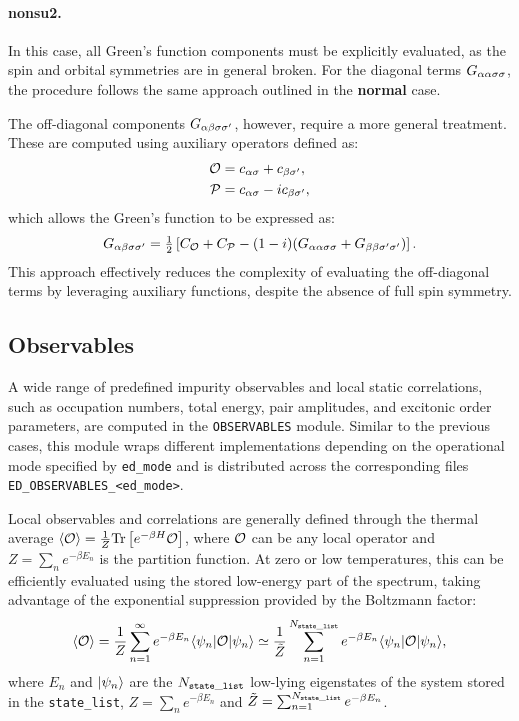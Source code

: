 \documentclass[edipack_sp.tex]{subfiles}
\begin{document}
\paragraph{{\bf nonsu2}.}
In this case, all Green's function components 
must be explicitly evaluated, as the spin and orbital 
symmetries are in general broken. For the diagonal terms 
$G_{\alpha\alpha\sigma\sigma}$, the procedure follows the same approach 
outlined in the {\bf normal} case. 

The off-diagonal components $G_{\alpha\beta\sigma\sigma'}$, however, 
require a more general treatment. These are computed using 
auxiliary operators defined as:
\begin{align*}
{\cal O} &= c_{\alpha\sigma} + c_{\beta\sigma'}, \\
{\cal P} &= c_{\alpha\sigma} - i c_{\beta\sigma'},
\end{align*}
which allows the Green's function to be expressed as:
\begin{equation}
G_{\alpha\beta\sigma\sigma'} = \tfrac{1}{2} \left[ C_{\cal O} + C_{\cal P} - 
(1-i)(G_{\alpha\alpha\sigma\sigma} + G_{\beta\beta\sigma'\sigma'}) \right].
\end{equation}
This approach effectively reduces the complexity of 
evaluating the off-diagonal terms by leveraging auxiliary 
functions, despite the absence of full spin symmetry.





\subsection{Observables}\label{sSecObc}
A wide range of predefined impurity observables and local 
static correlations, such as occupation numbers, total 
energy, pair amplitudes, and excitonic order parameters, 
are computed in the \texttt{OBSERVABLES} module. Similar to the
previous cases, this module wraps different implementations 
depending on the operational mode specified by 
{\tt ed\_mode} and is distributed across the corresponding 
files {\tt ED\_OBSERVABLES\_<ed\_mode>}. 



Local observables and correlations are generally defined 
through the thermal average 
$\langle {\cal O}\rangle = \tfrac{1}{Z}{\rm Tr}\left[e^{-\beta H}{\cal O}\right]$, 
where ${\cal O}$ can be any local operator and  $Z = \sum_n e^{-\beta E_n}$ is the partition function. 
At zero or low temperatures, this can be efficiently 
evaluated using the stored low-energy part of the spectrum, 
taking advantage of the exponential suppression provided by 
the Boltzmann factor:
\begin{equation}
\langle {\cal O}\rangle 
= \frac{1}{Z}\sum_{n=1}^{\infty} e^{-\beta E_n}
\langle \psi_n| {\cal O} |\psi_n\rangle\simeq \frac{1}{\tilde{Z}}\sum_{n=1}^{N_{\tt state\_list}} e^{-\beta E_n}
\langle \psi_n| {\cal O} |\psi_n\rangle,
\label{eq:thermal_average}
\end{equation}
where $E_n$ and $|\psi_n\rangle$ are the $N_{\tt state\_list}$ low-lying eigenstates 
of the system stored in the {\tt state\_list},  $Z=\sum_n e^{-\beta E_n}$ and  $\tilde{Z}=\sum_{n=1}^{N_{\tt state\_list}}e^{-\beta E_n}$. 
\end{document}
